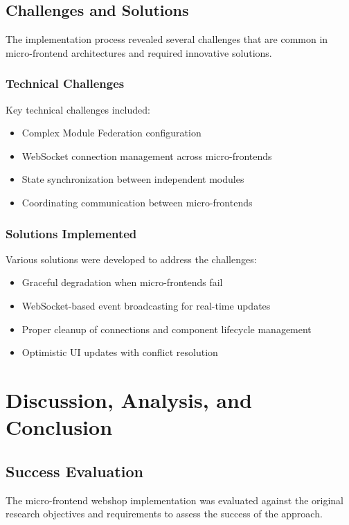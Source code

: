 \documentclass[12pt,a4paper]{report}
\begin{document}
\section{Challenges and Solutions}

The implementation process revealed several challenges that are common in micro-frontend architectures and required innovative solutions.

\subsection{Technical Challenges}

Key technical challenges included:
\begin{itemize}
    \item Complex Module Federation configuration
    \item WebSocket connection management across micro-frontends
    \item State synchronization between independent modules
    \item Coordinating communication between micro-frontends
\end{itemize}

\subsection{Solutions Implemented}

Various solutions were developed to address the challenges:
\begin{itemize}
    \item Graceful degradation when micro-frontends fail
    \item WebSocket-based event broadcasting for real-time updates
    \item Proper cleanup of connections and component lifecycle management
    \item Optimistic UI updates with conflict resolution
\end{itemize}

\chapter{Discussion, Analysis, and Conclusion}
\section{Success Evaluation}

The micro-frontend webshop implementation was evaluated against the original research objectives and requirements to assess the success of the approach.
\end{document}
